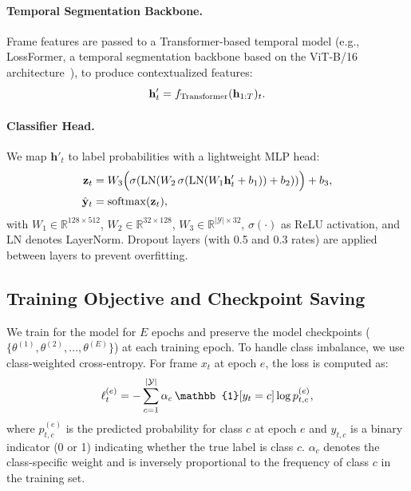 \documentclass{article}
\theoremstyle{plain}
\theoremstyle{definition}
\theoremstyle{remark}
\begin{document}
\vspace{-0.4em}
\paragraph{Temporal Segmentation Backbone.}
Frame features are passed to a Transformer-based temporal model (e.g., LossFormer, a temporal segmentation backbone based on the ViT-B/16 architecture~\cite{attention}), to produce contextualized features:
\vspace{-0.4em}
\begin{equation}
\mathbf{h}'_t = f_{\text{Transformer}}(\mathbf{h}_{1:T})_t.
\vspace{-0.4em}
\end{equation}

\vspace{-0.4em}
\paragraph{Classifier Head.}
We map $\mathbf{h}'_t$ to label probabilities with a lightweight MLP head:
\vspace{-0.4em}
\begin{align}
\mathbf{z}_t &= W_3\Big(\sigma(\mathrm{LN}(W_2\,\sigma(\mathrm{LN}(W_1\mathbf{h}'_t + b_1)) + b_2))\Big) + b_3, \notag\\
\hat{\mathbf{y}}_t &= \mathrm{softmax}(\mathbf{z}_t),
\vspace{-0.4em}
\end{align}
with $W_1 \in \mathbb{R}^{128 \times 512}$, $W_2 \in \mathbb{R}^{32 \times 128}$, $W_3 \in \mathbb{R}^{|\mathcal{Y}| \times 32}$, $\sigma(\cdot)$ as ReLU activation, and LN denotes LayerNorm. Dropout layers (with 0.5 and 0.3 rates) are applied between layers to prevent overfitting.

\subsection{Training Objective and Checkpoint Saving}
We train for the model for $E$ epochs and preserve the model checkpoints ($\{\theta^{(1)}, \theta^{(2)}, \dots, \theta^{(E)}\}$) at each training epoch. To handle class imbalance, we use class-weighted cross-entropy. For frame $x_t$ at epoch $e$, the loss is computed as:
\vspace{-0.4em}
\begin{equation}
\ell^{(e)}_t = -\sum_{c=1}^{|\mathcal{Y}|}\alpha_c\,\mathbb{1}[y_t=c]\log {p}^{(e)}_{t,c},
\vspace{-0.4em}
\end{equation}
where $p_{t,c}^{(e)}$ is the predicted probability for class $c$ at epoch $e$ and $y_{t,c}$ is a binary indicator (0 or 1) indicating whether the true label is class $c$. $\alpha_c$ denotes the class-specific weight and is inversely proportional to the frequency of class $c$ in the training set.
\end{document}
